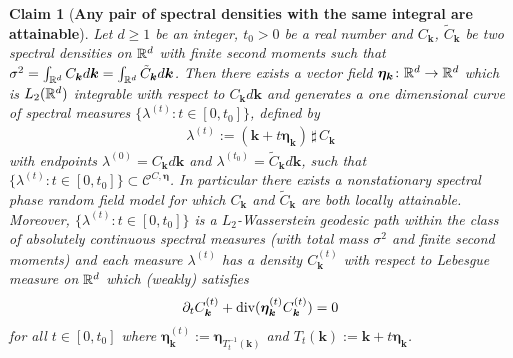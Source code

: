 \documentclass[10pt,noinfoline]{imsart}
\newtheorem{claim}{Claim}
\newcommand{\bs}{\boldsymbol}
\begin{document}
\begin{claim}[\textbf{Any pair of spectral densities with the same integral are attainable}]
\label{claim any two spec are attainable}
Let $d\geq 1$ be an integer, $t_0 > 0$ be a real number and $C_{\bs k}$, $\tilde C_{\bs k}$ be two spectral densities on $\Bbb R^d$ with finite second moments such that $\sigma^2 = \int_{\Bbb R^d}  C_{\bs k}d\bs k = \int_{\Bbb R^d} \tilde C_{\bs k}d\bs k$. Then there exists a vector field $\bs \eta_{\bs k}\colon \Bbb R^d \rightarrow \Bbb R^d$ which is $L_2(\Bbb R^d)$ integrable with respect to $C_{\bs k}d\bs k$ and  generates a one dimensional curve of spectral measures  $\{\lambda^{(t)}: t\in [0,t_0]\}$, defined by 
\begin{align}
\lambda^{(t)} := (\bs k + t\bs \eta_{\bs k})\,\sharp\, C_{\bs k}
\end{align}
with endpoints $\lambda^{(0)}=C_{\bs k}d\bs k$ and $\lambda^{(t_0)}=\tilde C_{\bs k}d\bs k$,
such that  $\{\lambda^{(t)}:t\in[0,t_0] \}\subset \mathscr C^{C,\bs\eta}$. In particular there exists a nonstationary spectral phase random field model for which  $C_{\bs k}$ and $\tilde C_{\bs k}$ are both locally attainable.
Moreover,  $\{\lambda^{(t)}: t\in [0,t_0]\}$ is a $L_2$-Wasserstein geodesic path within the class of absolutely continuous spectral measures (with total mass $\sigma^2$ and finite second moments) and each measure $\lambda^{(t)}$ has a density $C^{(t)}_{\bs k}$ with respect to Lebesgue measure on $\Bbb R^d$ which (weakly) satisfies 
\begin{align}
\label{div flow for geo}
\partial_t C^{(t)}_{\bs k} +\text{\rm div}(\bs \eta^{(t)}_{\bs k}C^{(t)}_{\bs k}) = 0
\end{align}
for all $t\in [0,t_0]$ where $\bs \eta^{(t)}_{\bs k}:=\bs \eta_{T_t^{-1}(\bs k)}$ and $T_t(\bs k):= \bs k + t\bs \eta_{\bs k}$.
\end{claim}
\end{document}

